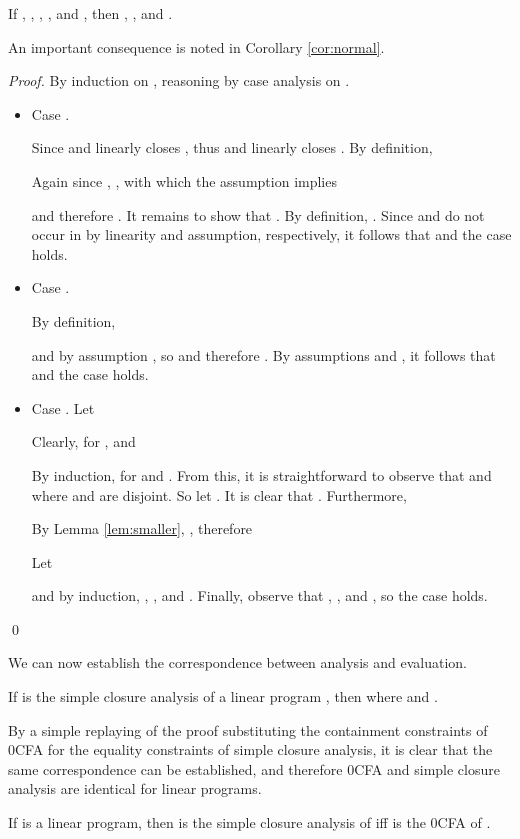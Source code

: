 \documentclass{llncs}
\begin{document}
\begin{theorem}\label{thm:main}
If , ,
, , and , then
, , and
.
\end{theorem}
An important consequence is noted in Corollary \ref{cor:normal}.

\begin{proof} By induction on , reasoning by case analysis on .
\begin{itemize}
\item Case .

Since  and  linearly closes , thus  and  linearly closes
.  By definition,

Again since , , with which the
assumption  implies

and therefore .  It
remains to show that .
By definition, .  Since  and  do not
occur in  by linearity and assumption, respectively, it
follows that  and the case
holds.

\item Case .

By definition,

and by assumption , so  and therefore
.
By assumptions  and
, it follows that
 and
the case holds.

\item Case . Let

Clearly, for ,  and


By induction, for  and .  From this, it is straightforward to observe that
 and  where  and  are disjoint.  So let
.  It is
clear that .  Furthermore,


By Lemma \ref{lem:smaller},
, therefore 

Let

and by induction, , , and .  Finally, observe that
,
, and
, so the case holds.
\end{itemize}
\qed
\end{proof}
We can now establish the correspondence between analysis and
evaluation.

\begin{corollary}\label{cor:normal}
If  is the simple closure analysis of a linear program
, then  where
 and .
\end{corollary}

By a simple replaying of the proof substituting the containment
constraints of 0CFA for the equality constraints of simple closure
analysis, it is clear that the same correspondence can be established,
and therefore 0CFA and simple closure analysis are identical for
linear programs.

\begin{corollary}
If  is a linear program, then  is the simple closure
analysis of  iff  is the 0CFA of .
\end{corollary}
\end{document}
